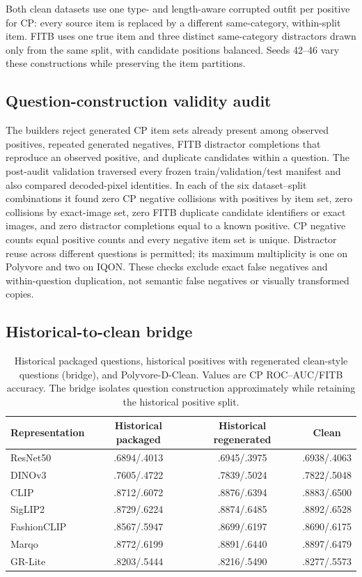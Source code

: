 \documentclass[preprint,12pt]{elsarticle}
\begin{document}
Both clean datasets use one type- and length-aware corrupted outfit per positive for CP: every source item is replaced by a different same-category, within-split item. FITB uses one true item and three distinct same-category distractors drawn only from the same split, with candidate positions balanced. Seeds 42--46 vary these constructions while preserving the item partitions.

\subsection{Question-construction validity audit}

The builders reject generated CP item sets already present among observed positives, repeated generated negatives, FITB distractor completions that reproduce an observed positive, and duplicate candidates within a question. The post-audit validation traversed every frozen train/validation/test manifest and also compared decoded-pixel identities. In each of the six dataset--split combinations it found zero CP negative collisions with positives by item set, zero collisions by exact-image set, zero FITB duplicate candidate identifiers or exact images, and zero distractor completions equal to a known positive. CP negative counts equal positive counts and every negative item set is unique. Distractor reuse across different questions is permitted; its maximum multiplicity is one on Polyvore and two on IQON. These checks exclude exact false negatives and within-question duplication, not semantic false negatives or visually transformed copies.

\subsection{Historical-to-clean bridge}

\begin{table}[htbp]
\caption{Historical packaged questions, historical positives with regenerated clean-style questions (bridge), and Polyvore-D-Clean. Values are CP ROC--AUC/FITB accuracy. The bridge isolates question construction approximately while retaining the historical positive split.}
\label{stab:bridge}
\centering\small
\begin{tabular}{lccc}
\toprule
Representation & Historical packaged & Historical regenerated & Clean \\
\midrule
ResNet50 & .6894/.4013 & .6945/.3975 & .6938/.4063 \\
DINOv3 & .7605/.4722 & .7839/.5024 & .7822/.5048 \\
CLIP & .8712/.6072 & .8876/.6394 & .8883/.6500 \\
SigLIP2 & .8729/.6224 & .8874/.6485 & .8892/.6528 \\
FashionCLIP & .8567/.5947 & .8699/.6197 & .8690/.6175 \\
Marqo & .8772/.6199 & .8891/.6440 & .8897/.6479 \\
GR-Lite & .8203/.5444 & .8216/.5490 & .8277/.5573 \\
\bottomrule
\end{tabular}
\end{table}
\end{document}
